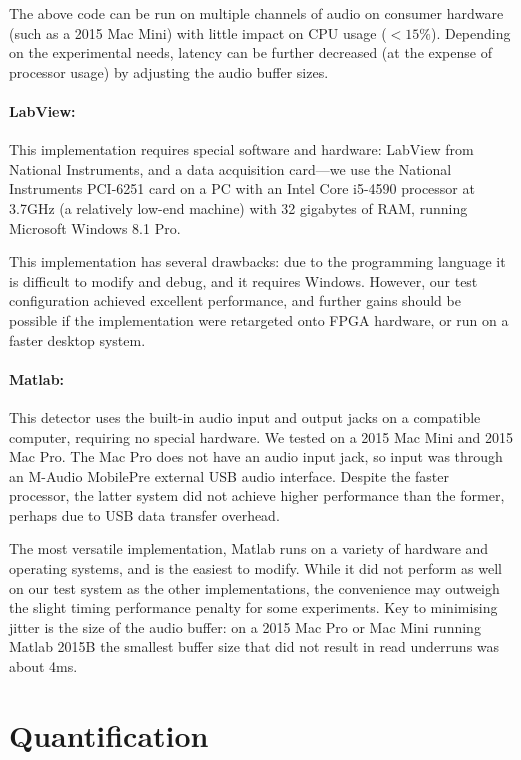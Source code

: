 \documentclass[10pt,letterpaper]{article}
\begin{document}
The above code can be run on multiple channels of audio on 
consumer hardware (such as a 2015 Mac Mini) with little impact
on CPU usage ($<15\%$). Depending on the experimental needs, latency
can be further decreased (at the expense of processor usage) by
adjusting the audio buffer sizes.

\paragraph{LabView:}

This implementation requires special software and hardware: LabView from National Instruments, and a data acquisition card---we use the National Instruments PCI-6251 card on a PC with an Intel Core i5-4590 processor at 3.7GHz (a relatively low-end machine) with 32 gigabytes of RAM, running Microsoft Windows 8.1 Pro.

This implementation has several drawbacks: due to the programming language it is difficult to modify and debug, and it requires Windows. However, our test configuration achieved excellent performance, and further gains should be possible if the implementation were retargeted onto FPGA hardware, or run on a faster desktop system.

\paragraph{Matlab:}

This detector uses the built-in audio input and output jacks on a compatible computer, requiring no special hardware.  We tested on a 2015 Mac Mini and 2015 Mac Pro.  The Mac Pro does not have an audio input jack, so input was through an M-Audio MobilePre external USB audio interface.  Despite the faster processor, the latter system did not achieve higher performance than the former, perhaps due to USB data transfer overhead.

The most versatile implementation, Matlab runs on a variety of hardware and operating systems, and is the easiest to modify.  While it did not perform as well on our test system as the other implementations, the convenience may outweigh the slight timing performance penalty for some experiments.  Key to minimising jitter is the size of the audio buffer: on a 2015 Mac Pro or Mac Mini running Matlab 2015B the smallest buffer size that did not result in read underruns was about 4ms.

\section{Quantification}
\label{sec:quantify}
\end{document}
